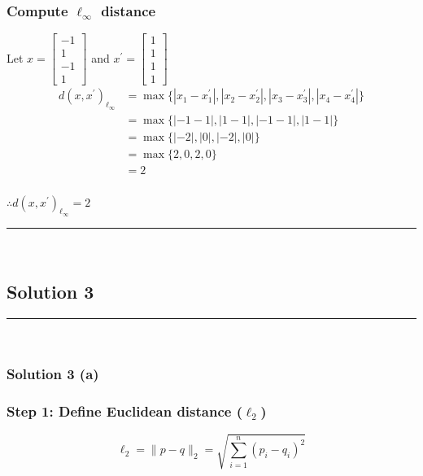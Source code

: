\documentclass{article}
\begin{document}
\subsubsection*{Compute $\ell_{\infty}$ distance}
\parbox{\textwidth}{
Let $x = \begin{bmatrix} -1 \\ 1 \\ -1 \\ 1 \end{bmatrix}$ and $x^{\prime}=\begin{bmatrix} 1 \\ 1 \\ 1 \\ 1 \end{bmatrix}$
\begin{align*}
    d(x, x^{\prime})_{\ell_\infty} &= \max\{|x_1 - x_1^{\prime}|, |x_2 - x_2^{\prime}|, |x_3 - x_3^{\prime}|, |x_4 - x_4^{\prime}|\} \\
    &= \max\{|-1 - 1|, |1 - 1|, |-1 - 1|, |1 - 1|\} \\
    &= \max\{|-2|, |0|, |-2|, |0|\} \\
    &= \max\{2, 0, 2, 0\} \\
    &= 2
\end{align*}
}
\subsubsection*{\normalfont}{$\therefore d(x, x^{\prime})_{\ell_\infty} = 2$}

\noindent\rule{\textwidth}{0.4pt}\\

\newpage

\subsection*{Solution 3}
\noindent\rule{\textwidth}{0.4pt}\\
\subsubsection*{Solution 3 (a)}
\subsubsection*{Step 1: Define Euclidean distance ($\ell_2$)}
\parbox{\textwidth}{

$$\ell_2 = \|p - q\|_2 = \sqrt{\sum_{i=1}^{n} (p_i - q_i)^2}$$

}
\end{document}

